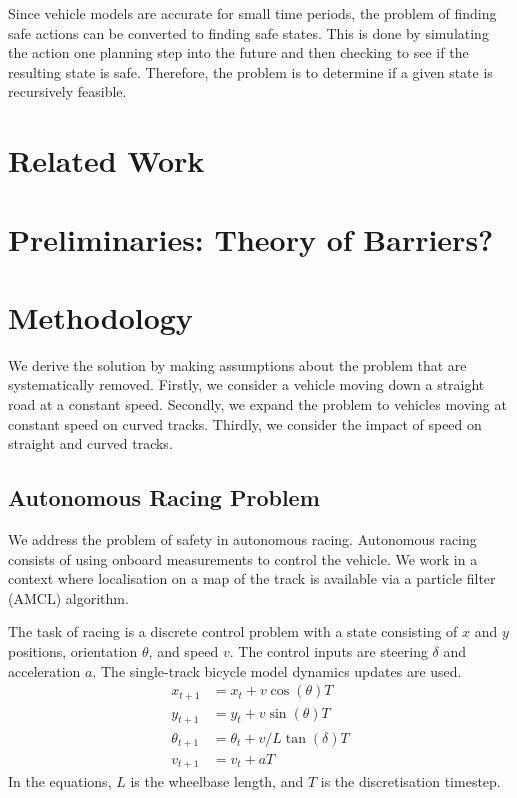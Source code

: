 \documentclass[letterpaper, 10 pt, conference]{ieeeconf}  %
\begin{document}
Since vehicle models are accurate for small time periods, the problem of finding safe actions can be converted to finding safe states.
This is done by simulating the action one planning step into the future and then checking to see if the resulting state is safe.
Therefore, the problem is to determine if a given state is recursively feasible.

\section{Related Work}


\section{Preliminaries: Theory of Barriers?} %



\section{Methodology}


We derive the solution by making assumptions about the problem that are systematically removed.
Firstly, we consider a vehicle moving down a straight road at a constant speed.
Secondly, we expand the problem to vehicles moving at constant speed on curved tracks.
Thirdly, we consider the impact of speed on straight and curved tracks.

\subsection{Autonomous Racing Problem}

We address the problem of safety in autonomous racing.
Autonomous racing consists of using onboard measurements to control the vehicle.
We work in a context where localisation on a map of the track is available via a particle filter (AMCL) algorithm.

The task of racing is a discrete control problem with a state consisting of $x$ and $y$ positions, orientation $\theta$, and speed $v$. 
The control inputs are steering $\delta$ and acceleration $a$.
The single-track bicycle model dynamics updates are used.
\begin{align}
    x_{t+1} &=x_t + v \cos (\theta) T\\
    y_{t+1} &=y_t + v \sin (\theta) T\\
    \theta_{t+1}& = \theta_t + v/L \tan (\delta) T\\
    v_{t+1} &= v_t + a T
\end{align}
In the equations, $L$ is the wheelbase length, and $T$ is the discretisation timestep.
\end{document}
